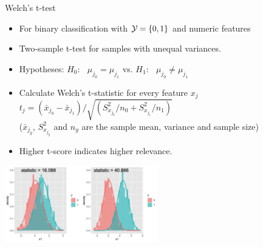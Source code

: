 \documentclass[11pt,compress,t,notes=noshow, xcolor=table]{beamer}
\begin{document}

  \begin{vbframe}{Welch's \MakeLowercase{t}-test}
  \begin{itemize}
  \setlength{\itemsep}{0.6em}
    \item For binary classification with $\mathcal{Y} = \{ 0, 1\}$ and numeric features
    \item Two-sample t-test for samples with unequal variances.
   \item Hypotheses:
    $H_0$: $\;\;\mu_{j_0} = \mu_{j_1} $ \qquad vs. \qquad $H_1$: $\;\;\mu_{j_0} \neq \mu_{j_1}$

    \item Calculate Welch's t-statistic for every feature $x_j$
    $ t_j = (\bar{x}_{j_0} - \bar{x}_{j_1})/ \sqrt{(S^2_{x_{j_0}}/n_0 + S^2_{x_{j_1}}/n_1)}$\\
    ($\bar{x}_{j_y}$, $S^2_{x_{j_{y}}}$ and $n_y$ are the sample mean, %
    variance and sample size)
    \item Higher t-score indicates higher relevance.
  \end{itemize}
\vspace{-0.1cm}
  \begin{center}
\includegraphics[width=0.5\textwidth]{figure/fs-t-test.png}
  \end{center}
  
  \end{vbframe}
\end{document}
